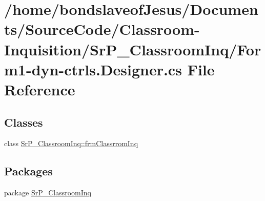\hypertarget{_form1-dyn-ctrls_8_designer_8cs}{
\section{/home/bondslaveof\-Jesus/\-Documents/\-Source\-Code/\-Classroom-\/\-Inquisition/\-Sr\-P\-\_\-\-Classroom\-Inq/\-Form1-\/dyn-\/ctrls.\-Designer.cs \-File \-Reference}
\label{_form1-dyn-ctrls_8_designer_8cs}
}
\subsection*{\-Classes}
\begin{DoxyCompactItemize}
\item 
class \hyperlink{class_sr_p___classroom_inq_1_1frm_classrrom_inq}{\-Sr\-P\-\_\-\-Classroom\-Inq\-::frm\-Classrrom\-Inq}
\end{DoxyCompactItemize}
\subsection*{\-Packages}
\begin{DoxyCompactItemize}
\item 
package \hyperlink{namespace_sr_p___classroom_inq}{\-Sr\-P\-\_\-\-Classroom\-Inq}
\end{DoxyCompactItemize}
